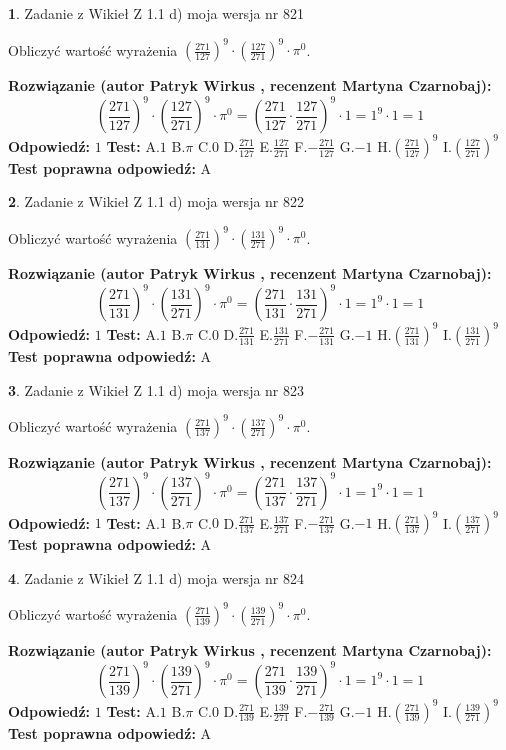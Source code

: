 \documentclass[12pt, a4paper]{article}
\theoremstyle{definition} %
\newtheorem{zad}{}
\newcommand{\zadStart}[1]{\begin{zad}#1\newline}
\newcommand{\zadStop}{\end{zad}}
\newcommand{\rozwStart}[2]{\noindent \textbf{Rozwiązanie (autor #1 , recenzent #2): }\newline}
\newcommand{\rozwStop}{\newline}
\newcommand{\odpStart}{\noindent \textbf{Odpowiedź:}\newline}
\newcommand{\odpStop}{\newline}
\newcommand{\testStart}{\noindent \textbf{Test:}\newline}
\newcommand{\testStop}{\newline}
\newcommand{\kluczStart}{\noindent \textbf{Test poprawna odpowiedź:}\newline}
\newcommand{\kluczStop}{\newline}
\begin{document}
\zadStart{Zadanie z Wikieł Z 1.1 d) moja wersja nr 821}

Obliczyć wartość wyrażenia $(\frac{271}{127})^{9} \cdot (\frac{127}{271})^{9} \cdot \pi^{0}$.
\zadStop
\rozwStart{Patryk Wirkus}{Martyna Czarnobaj}
$$(\frac{271}{127})^{9} \cdot (\frac{127}{271})^{9} \cdot \pi^{0} = (\frac{271}{127} \cdot \frac{127}{271})^{9} \cdot 1 = 1^{9} \cdot 1 = 1$$
\rozwStop
\odpStart
$1$
\odpStop
\testStart
A.$1$ B.$\pi$ C.$0$ D.$\frac{271}{127}$ E.$\frac{127}{271}$
F.$-\frac{271}{127}$ G.$-1$
H.$(\frac{271}{127})^{9}$
I.$(\frac{127}{271})^{9}$
\testStop
\kluczStart
A
\kluczStop



\zadStart{Zadanie z Wikieł Z 1.1 d) moja wersja nr 822}

Obliczyć wartość wyrażenia $(\frac{271}{131})^{9} \cdot (\frac{131}{271})^{9} \cdot \pi^{0}$.
\zadStop
\rozwStart{Patryk Wirkus}{Martyna Czarnobaj}
$$(\frac{271}{131})^{9} \cdot (\frac{131}{271})^{9} \cdot \pi^{0} = (\frac{271}{131} \cdot \frac{131}{271})^{9} \cdot 1 = 1^{9} \cdot 1 = 1$$
\rozwStop
\odpStart
$1$
\odpStop
\testStart
A.$1$ B.$\pi$ C.$0$ D.$\frac{271}{131}$ E.$\frac{131}{271}$
F.$-\frac{271}{131}$ G.$-1$
H.$(\frac{271}{131})^{9}$
I.$(\frac{131}{271})^{9}$
\testStop
\kluczStart
A
\kluczStop



\zadStart{Zadanie z Wikieł Z 1.1 d) moja wersja nr 823}

Obliczyć wartość wyrażenia $(\frac{271}{137})^{9} \cdot (\frac{137}{271})^{9} \cdot \pi^{0}$.
\zadStop
\rozwStart{Patryk Wirkus}{Martyna Czarnobaj}
$$(\frac{271}{137})^{9} \cdot (\frac{137}{271})^{9} \cdot \pi^{0} = (\frac{271}{137} \cdot \frac{137}{271})^{9} \cdot 1 = 1^{9} \cdot 1 = 1$$
\rozwStop
\odpStart
$1$
\odpStop
\testStart
A.$1$ B.$\pi$ C.$0$ D.$\frac{271}{137}$ E.$\frac{137}{271}$
F.$-\frac{271}{137}$ G.$-1$
H.$(\frac{271}{137})^{9}$
I.$(\frac{137}{271})^{9}$
\testStop
\kluczStart
A
\kluczStop



\zadStart{Zadanie z Wikieł Z 1.1 d) moja wersja nr 824}

Obliczyć wartość wyrażenia $(\frac{271}{139})^{9} \cdot (\frac{139}{271})^{9} \cdot \pi^{0}$.
\zadStop
\rozwStart{Patryk Wirkus}{Martyna Czarnobaj}
$$(\frac{271}{139})^{9} \cdot (\frac{139}{271})^{9} \cdot \pi^{0} = (\frac{271}{139} \cdot \frac{139}{271})^{9} \cdot 1 = 1^{9} \cdot 1 = 1$$
\rozwStop
\odpStart
$1$
\odpStop
\testStart
A.$1$ B.$\pi$ C.$0$ D.$\frac{271}{139}$ E.$\frac{139}{271}$
F.$-\frac{271}{139}$ G.$-1$
H.$(\frac{271}{139})^{9}$
I.$(\frac{139}{271})^{9}$
\testStop
\kluczStart
A
\kluczStop
\end{document}
